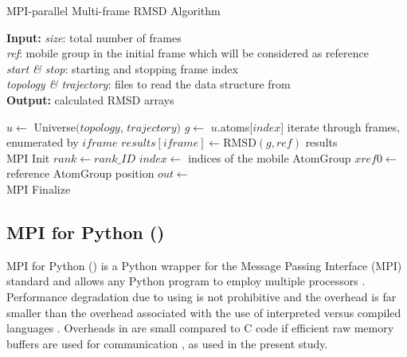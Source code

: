 \begin{algorithm}[ht]
	\scriptsize
	\caption{MPI-parallel Multi-frame RMSD Algorithm}
	\label{alg:RMSD}
	\hspace*{\algorithmicindent} \textbf{Input:} \emph{size}: total number of frames \\
	\hspace*{\algorithmicindent} \emph{ref}: mobile group in the initial frame which will be considered as reference \\
	\hspace*{\algorithmicindent} \emph{start \& stop}: starting and stopping frame index\\
	\hspace*{\algorithmicindent} \emph{topology \& trajectory}: files to read the data structure from \\
	\hspace*{\algorithmicindent} \textbf{Output:} calculated RMSD arrays
	\begin{algorithmic}[1]
		\State $u \gets$ Universe$(topology$, $trajectory)$
		\State $g \gets$ $u.$atoms[$index$]  
		 \Comment iterate through frames, enumerated by $iframe$
		\State $results[iframe] \gets \text{RMSD}(g, ref)$ 
		\EndFor
		\State \Return results
		\EndFunction
		\\        
		\State MPI Init
		\State $rank \gets rank\_ID$
		\State $index \gets$ indices of the mobile AtomGroup
		\State $xref0 \gets$ reference AtomGroup position
		\State $out \gets$ 
                \\
		\State {}
		\State MPI Finalize
	\end{algorithmic}
\end{algorithm}


\subsection{MPI for Python ()}
\label{sec:methods-mpi4py}

MPI for Python () is a Python wrapper for the Message Passing Interface (MPI) standard and allows any Python program to employ multiple processors \cite{Dalcin:2011aa, Dalcin:2005aa}.
Performance degradation due to using  is not prohibitive \cite{Dalcin:2011aa, Dalcin:2005aa} and the overhead is far smaller than the overhead associated with the use of interpreted versus compiled languages \cite{GAiN}.
Overheads in  are small compared to C code if efficient raw memory buffers are used for communication \cite{Dalcin:2011aa}, as used in the present study.

